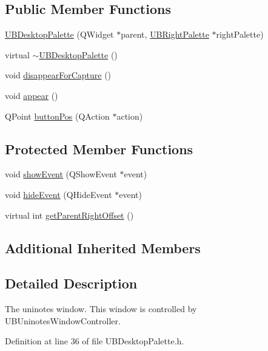 \subsection*{Public Member Functions}
\begin{DoxyCompactItemize}
\item 
\hyperlink{class_u_b_desktop_palette_a988f398743822ce378c62be1685056d9}{U\-B\-Desktop\-Palette} (Q\-Widget $\ast$parent, \hyperlink{class_u_b_right_palette}{U\-B\-Right\-Palette} $\ast$right\-Palette)
\item 
virtual \hyperlink{class_u_b_desktop_palette_a5434f6968247bbdf1288540dcdf47cba}{$\sim$\-U\-B\-Desktop\-Palette} ()
\item 
void \hyperlink{class_u_b_desktop_palette_a9e068a68eeff31e33838739ca5334a11}{disappear\-For\-Capture} ()
\item 
void \hyperlink{class_u_b_desktop_palette_abc0075678884edd5de996c325221b70c}{appear} ()
\item 
Q\-Point \hyperlink{class_u_b_desktop_palette_adb9fc3ce73c90854f6e01a25fa89fcfe}{button\-Pos} (Q\-Action $\ast$action)
\end{DoxyCompactItemize}
\subsection*{Protected Member Functions}
\begin{DoxyCompactItemize}
\item 
void \hyperlink{class_u_b_desktop_palette_a1d1a55372fc59e681f23cfd895716a8c}{show\-Event} (Q\-Show\-Event $\ast$event)
\item 
void \hyperlink{class_u_b_desktop_palette_a8d38edaf6fab997a0a696aa188ebb65a}{hide\-Event} (Q\-Hide\-Event $\ast$event)
\item 
virtual int \hyperlink{class_u_b_desktop_palette_aa6f4f3da38505de57603b9ea27a6473f}{get\-Parent\-Right\-Offset} ()
\end{DoxyCompactItemize}
\subsection*{Additional Inherited Members}


\subsection{Detailed Description}
The uninotes window. This window is controlled by U\-B\-Uninotes\-Window\-Controller. 

Definition at line 36 of file U\-B\-Desktop\-Palette.\-h.



